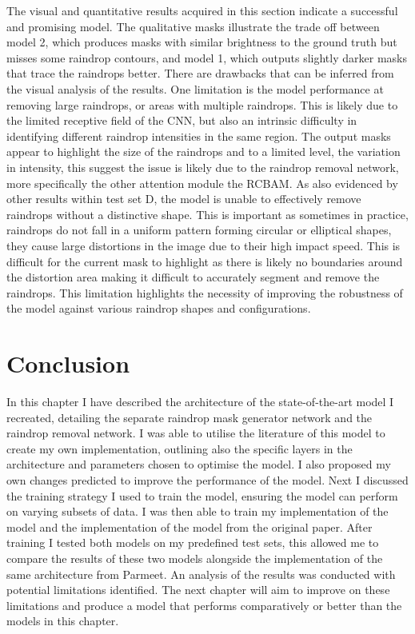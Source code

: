 \documentclass[11pt]{ociamthesis}  %
\begin{document}
The visual and quantitative results acquired in this section indicate a successful and promising model. The qualitative masks illustrate the trade off between model 2, which produces masks with similar brightness to the ground truth but misses some raindrop contours, and model 1, which outputs slightly darker masks that trace the raindrops better. There are drawbacks that can be inferred from the visual analysis of the results. One limitation is the model performance at removing large raindrops, or areas with multiple raindrops. This is likely due to the limited receptive field of the CNN, but also an intrinsic difficulty in identifying different raindrop intensities in the same region. The output masks appear to highlight the size of the raindrops and to a limited level, the variation in intensity, this suggest the issue is likely due to the raindrop removal network, more specifically the other attention module the RCBAM. As also evidenced by other results within test set D, the model is unable to effectively remove raindrops without a distinctive shape. This is important as sometimes in practice, raindrops do not fall in a uniform pattern forming circular or elliptical shapes, they cause large distortions in the image due to their high impact speed. This is difficult for the current mask to highlight as there is likely no boundaries around the distortion area making it difficult to accurately segment and remove the raindrops. This limitation highlights the necessity of improving the robustness of the model against various raindrop shapes and configurations. 

\section{Conclusion}
In this chapter I have described the architecture of the state-of-the-art model I recreated, detailing the separate raindrop mask generator network and the raindrop removal network. I was able to utilise the literature of this model to create my own implementation, outlining also the specific layers in the architecture and parameters chosen to optimise the model. I also proposed my own changes predicted to improve the performance of the model. Next I discussed the training strategy I used to train the model, ensuring the model can perform on varying subsets of data. I was then able to train my implementation of the model and the implementation of the model from the original paper. After training I tested both models on my predefined test sets, this allowed me to compare the results of these two models alongside the implementation of the same architecture from Parmeet\cite{Parmeet_Report}. An analysis of the results was conducted with potential limitations identified. The next chapter will aim to improve on these limitations and produce a model that performs comparatively or better than the models in this chapter.
\end{document}

